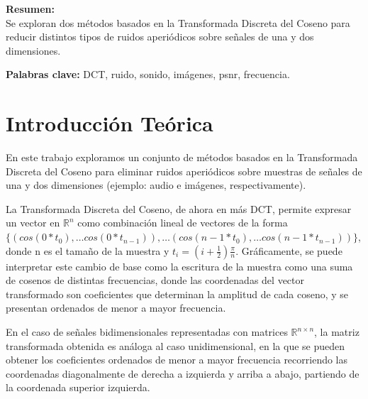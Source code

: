 \documentclass[a4paper,10pt,twoside]{article}
\begin{document}
\textbf{Resumen:} \\
Se exploran dos métodos basados en la Transformada Discreta del Coseno para reducir distintos tipos de ruidos aperiódicos sobre señales de una y dos dimensiones.

\textbf{Palabras clave:}
DCT, ruido, sonido, imágenes, psnr, frecuencia.
\newpage




\tableofcontents

\newpage




\section{Introducción Teórica}

En este trabajo exploramos un conjunto de métodos basados en la Transformada Discreta del Coseno para eliminar ruidos aperiódicos sobre muestras de señales de una y dos dimensiones (ejemplo: audio e imágenes, respectivamente).

La Transformada Discreta del Coseno, de ahora en más DCT, permite expresar un vector en $\mathbb{R}^n$ como combinación lineal de vectores de la forma $\{(cos(0 * t_0), \ldots cos(0 * t_{n-1})), \ldots (cos(n-1 * t_0), \ldots cos(n-1 * t_{n-1})) \}$, donde n es el tamaño de la muestra y $t_i = (i + \frac{1}{2})\frac{\pi}{n}$. Gráficamente, se puede interpretar este cambio de base como la escritura de la muestra como una suma de cosenos de distintas frecuencias, donde las coordenadas del vector transformado son coeficientes que determinan la amplitud de cada coseno, y se presentan ordenados de menor a mayor frecuencia.

En el caso de señales bidimensionales representadas con matrices $\mathbb{R}^{n \times n}$, la matriz transformada obtenida es análoga al caso unidimensional, en la que se pueden obtener los coeficientes ordenados de menor a mayor frecuencia recorriendo las coordenadas diagonalmente de derecha a izquierda y arriba a abajo, partiendo de la coordenada superior izquierda.
\end{document}
